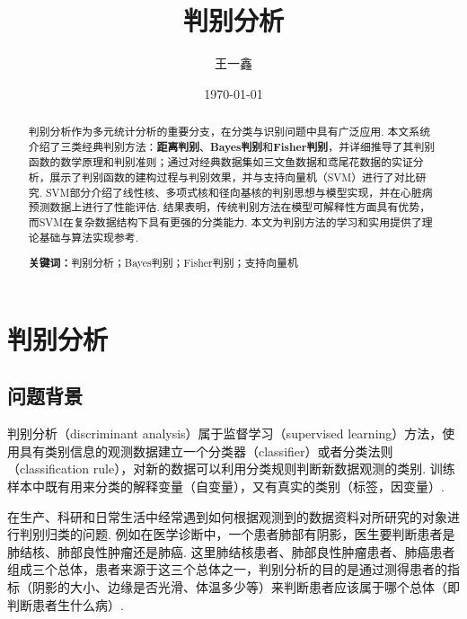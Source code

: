 \documentclass[12pt, a4paper, oneside]{ctexart}
\title{\textbf{判别分析}}
\author{王一鑫}
\date{\today}
\begin{document}
	
	\maketitle
	
	\setcounter{page}{0}
	\maketitle
	\thispagestyle{empty}
	
	\begin{abstract} 
		判别分析作为多元统计分析的重要分支，在分类与识别问题中具有广泛应用. 本文系统介绍了三类经典判别方法：\textbf{距离判别}、\textbf{Bayes判别}和\textbf{Fisher判别}，并详细推导了其判别函数的数学原理和判别准则；通过对经典数据集如三文鱼数据和鸢尾花数据的实证分析，展示了判别函数的建构过程与判别效果，并与支持向量机（SVM）进行了对比研究. SVM部分介绍了线性核、多项式核和径向基核的判别思想与模型实现，并在心脏病预测数据上进行了性能评估. 结果表明，传统判别方法在模型可解释性方面具有优势，而SVM在复杂数据结构下具有更强的分类能力. 本文为判别方法的学习和实用提供了理论基础与算法实现参考.
		
		\par\textbf{关键词：}判别分析；Bayes判别；Fisher判别；支持向量机
	\end{abstract}
	
	
	\newpage
	\setcounter{page}{1}
	\tableofcontents
	\newpage
	\setcounter{page}{1}
	
	\section{判别分析}
	
	\subsection{问题背景}
	
	判别分析（discriminant analysis）属于监督学习（supervised learning）方法，使用具有类别信息的观测数据建立一个分类器（classifier）或者分类法则（classification rule），对新的数据可以利用分类规则判断新数据观测的类别. 训练样本中既有用来分类的解释变量（自变量），又有真实的类别（标签，因变量）.
	
	在生产、科研和日常生活中经常遇到如何根据观测到的数据资料对所研究的对象进行判别归类的问题. 例如在医学诊断中，一个患者肺部有阴影，医生要判断患者是肺结核、肺部良性肿瘤还是肺癌. 这里肺结核患者、肺部良性肿瘤患者、肺癌患者组成三个总体，患者来源于这三个总体之一，判别分析的目的是通过测得患者的指标（阴影的大小、边缘是否光滑、体温多少等）来判断患者应该属于哪个总体（即判断患者生什么病）.
	
\end{document}
